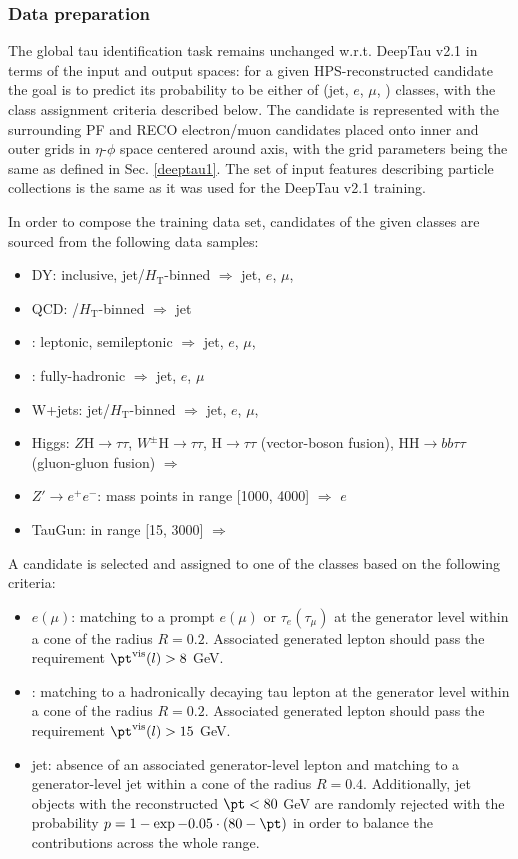 \subsubsection{Data preparation}
The global tau identification task remains unchanged w.r.t. DeepTau v2.1 in terms of the input and output spaces: for a given HPS-reconstructed \tauh candidate the goal is to predict its probability to be either of (jet, $e$, $\mu$, \tauh) classes, with the class assignment criteria described below. The \tauh candidate is represented with the surrounding PF and RECO electron/muon candidates placed onto inner and outer grids in $\eta$-$\phi$ space centered around \tauh axis, with the grid parameters being the same as defined in Sec. \ref{deeptau1}. The set of input features describing particle collections is the same as it was used for the DeepTau v2.1 training.

In order to compose the training data set, \tauh candidates of the given classes are sourced from the following data samples:
\begin{itemize} \label{v2.5:datagroups}
    \item DY: inclusive, jet/$H_\text{T}$-binned $\Rightarrow$ jet, $e$, $\mu$, \tauh
    \item QCD: \pt/$H_\text{T}$-binned $\Rightarrow$ jet
    \item \ttbar: leptonic, semileptonic $\Rightarrow$ jet, $e$, $\mu$, \tauh
    \item \ttbar: fully-hadronic $\Rightarrow$ jet, $e$, $\mu$
    \item W+jets: jet/$H_\text{T}$-binned $\Rightarrow$ jet, $e$, $\mu$, \tauh
    \item Higgs: $Z \text{H}\to \tau\tau$, $W^\pm \text{H}\to \tau\tau$, $\text{H}\to \tau\tau$ (vector-boson fusion), $\text{H}\text{H}\to bb\tau\tau$ (gluon-gluon fusion) $\Rightarrow$ \tauh
    \item $Z' \to e^+e^-$: mass points in range [1000, 4000] $\Rightarrow$ $e$  
    \item TauGun: \pt in range [15, 3000] $\Rightarrow$ \tauh
\end{itemize}

A \tauh candidate is selected and assigned to one of the classes based on the following criteria:
\begin{itemize}
    \item $e (\mu)$: matching to a prompt $e (\mu)$ or $\tau_e (\tau_\mu)$ at the generator level within a cone of the radius $R=0.2$. Associated generated lepton should pass the requirement $\pt^{\text{vis}}(l)>8$ GeV.
    \item \tauh: matching to a hadronically decaying tau lepton at the generator level within a cone of the radius $R=0.2$. Associated generated lepton should pass the requirement $\pt^{\text{vis}}(l)>15$ GeV.
    \item jet: absence of an associated generator-level lepton and matching to a generator-level jet within a cone of the radius $R=0.4$. Additionally, jet objects with the reconstructed $\pt < 80$ GeV are randomly rejected with the probability $p = 1 - \exp{-0.05\cdot(80-\pt)}$ in order to balance the contributions across the whole \pt range.
\end{itemize}

